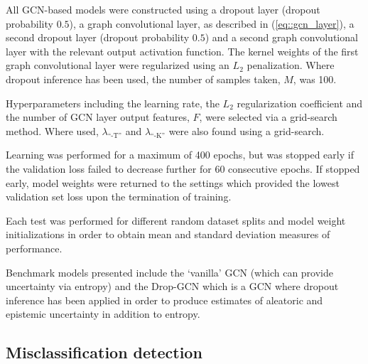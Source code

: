 \documentclass[journal]{IEEEtran}
\begin{document}
All GCN-based models were constructed using a dropout layer (dropout probability $0.5$), a graph convolutional layer, as described in (\ref{eq::gcn_layer}), a second dropout layer (dropout probability $0.5$) and a second graph convolutional layer with the relevant output activation function. The kernel weights of the first graph convolutional layer were regularized using an $L_2$ penalization. Where dropout inference has been used, the number of samples taken, $M$, was 100. 

Hyperparameters including the learning rate, the $L_2$ regularization coefficient and the number of GCN layer output features, $F$, were selected via a grid-search method. Where used, $\lambda_{\text{``-T''}}$ and $\lambda_{\text{``-K''}}$ were also found using a grid-search.

Learning was performed for a maximum of 400 epochs, but was stopped early if the validation loss failed to decrease further for 60 consecutive epochs. If stopped early, model weights were returned to the settings which provided the lowest validation set loss upon the termination of training.
    
Each test was performed for different random dataset splits and model weight initializations in order to obtain mean and standard deviation measures of performance.

Benchmark models presented include the `vanilla' GCN (which can provide uncertainty via entropy) and the Drop-GCN which is a GCN where dropout inference has been applied in order to produce estimates of aleatoric and epistemic uncertainty in addition to entropy.

\subsection{Misclassification detection}
\end{document}
